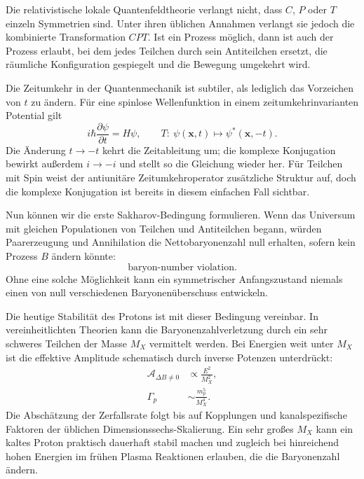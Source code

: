 Die relativistische lokale Quantenfeldtheorie verlangt nicht, dass \(C\), \(P\) oder \(T\) einzeln Symmetrien sind. Unter ihren üblichen Annahmen verlangt sie jedoch die kombinierte Transformation \(CPT\). Ist ein Prozess möglich, dann ist auch der Prozess erlaubt, bei dem jedes Teilchen durch sein Antiteilchen ersetzt, die räumliche Konfiguration gespiegelt und die Bewegung umgekehrt wird.

Die Zeitumkehr in der Quantenmechanik ist subtiler, als lediglich das Vorzeichen von \(t\) zu ändern. Für eine spinlose Wellenfunktion in einem zeitumkehrinvarianten Potential gilt
\begin{equation}
i\hbar\frac{\partial\psi}{\partial t}=H\psi,
\qquad
T:\ \psi(\mathbf x,t)\longmapsto\psi^*(\mathbf x,-t).
\end{equation}
Die Änderung \(t\to-t\) kehrt die Zeitableitung um; die komplexe Konjugation bewirkt außerdem \(i\to-i\) und stellt so die Gleichung wieder her. Für Teilchen mit Spin weist der antiunitäre Zeitumkehroperator zusätzliche Struktur auf, doch die komplexe Konjugation ist bereits in diesem einfachen Fall sichtbar.

\begin{classroomqa}\end{classroomqa}

Nun können wir die erste Sakharov-Bedingung formulieren. Wenn das Universum mit gleichen Populationen von Teilchen und Antiteilchen begann, würden Paarerzeugung und Annihilation die Nettobaryonenzahl null erhalten, sofern kein Prozess \(B\) ändern könnte:
\begin{equation}
\boxed{\text{baryon-number violation}.}
\end{equation}
Ohne eine solche Möglichkeit kann ein symmetrischer Anfangszustand niemals einen von null verschiedenen Baryonenüberschuss entwickeln.

Die heutige Stabilität des Protons ist mit dieser Bedingung vereinbar. In vereinheitlichten Theorien kann die Baryonenzahlverletzung durch ein sehr schweres Teilchen der Masse \(M_X\) vermittelt werden. Bei Energien weit unter \(M_X\) ist die effektive Amplitude schematisch durch inverse Potenzen unterdrückt:
\begin{equation}
\begin{aligned}
\mathcal A_{\Delta B\ne0}&\propto \frac{E^2}{M_X^2},\\
\Gamma_p&\sim \frac{m_p^5}{M_X^4}.
\end{aligned}
\label{eq:c08-heavy-suppression}
\end{equation}
Die Abschätzung der Zerfallsrate folgt bis auf Kopplungen und kanalspezifische Faktoren der üblichen Dimensionssechs-Skalierung. Ein sehr großes \(M_X\) kann ein kaltes Proton praktisch dauerhaft stabil machen und zugleich bei hinreichend hohen Energien im frühen Plasma Reaktionen erlauben, die die Baryonenzahl ändern.

